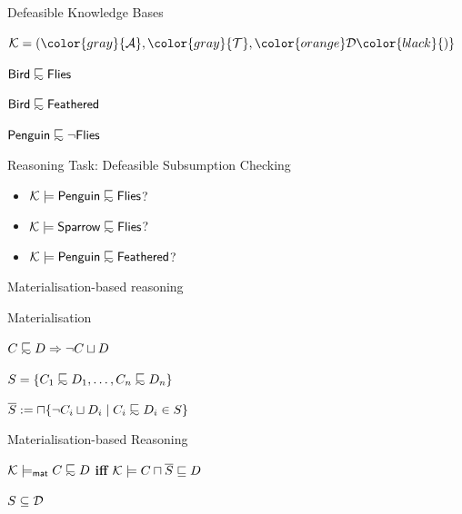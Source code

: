 \documentclass[10pt]{beamer}
\begin{document}
\begin{frame}[fragile]{Defeasible Knowledge Bases}
  \begin{center}
    \Large{$\Kmc = (\color{gray}{\Amc}, \color{gray}{\Tmc}, {\color{orange}\Dmc}\color{black}{)}$}
  \end{center}

    \vspace{2mm}


    \Large{
    \color{orange}
    $\dlFont{Bird} \definc \dlFont{Flies}$

    $\dlFont{Bird} \definc \dlFont{Feathered}$

    $\dlFont{Penguin} \definc \lnot \dlFont{Flies}$
  }
\end{frame}

%
%

\begin{frame}[fragile]{Reasoning Task: Defeasible Subsumption Checking}  

\Large{
\begin{itemize}
  \item $\Kmc \models \dlFont{Penguin} \definc \dlFont{Flies}$?
  \item $\Kmc \models \dlFont{Sparrow} \definc \dlFont{Flies}$?
  \item $\Kmc \models \dlFont{Penguin} \definc \dlFont{Feathered}$?
\end{itemize}
}

\end{frame}


%
%


\begin{frame}[fragile]{Materialisation-based reasoning}
  \begin{center}
    \Large {
      Materialisation
    }

    \LARGE{
  $C \definc D \Rightarrow \lnot C \sqcup D$
    }
\end{center}

\pause
\Large{ $S = \{C_1 \definc D_1, \dots, C_n \definc D_n\}$

$\overline{S} := \sqcap \{\lnot C_i \sqcup D_i \mid C_i \definc D_i \in S\}$
}

\pause 
\begin{center}
  \Large{Materialisation-based Reasoning}
\end{center}

$\Kmc \models_{\mathsf{mat}} C \definc D$ \textbf{iff} $\mathcal{K} \models C \sqcap \overline{S} \sqsubseteq D$ 

$S \subseteq \mathcal{D}$
\end{frame}
\end{document}
